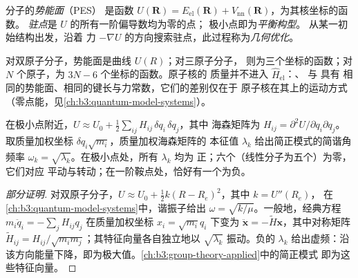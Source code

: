\begin{definition}\label{def:b3:computational-chemistry:pes}
分子的\emph{势能面}（PES）
是函数 $U(\mathbf R) = E_{\mathrm{el}}(\mathbf R) +
V_{\mathrm{nn}}(\mathbf R)$，为其核坐标的函数。
\emph{驻点}是 $U$ 的所有一阶偏导数均为零的点；
极小点即为\emph{平衡构型}。
从某一初始结构出发，沿着
力 $-\nabla U$ 的方向搜索驻点，此过程称为\emph{几何优化}。
\end{definition}

对双原子分子，势能面是曲线 $U(R)$；对三原子分子，
则为三个坐标的函数；对 $N$ 个原子，为 $3N - 6$ 个坐标的函数。原子核的
质量并不进入 $\hat H_{\mathrm{el}}$：、 与  具有
相同的势能面、相同的键长与力常数，它们的差别仅在于
原子核在其上的运动方式（零点能，见\cref{ch:b3:quantum-model-systems}）。

\begin{proposition}[由海森矩阵求频率]\label{prop:b3:computational-chemistry:hessian}
在极小点附近，$U \approx U_0 + \frac12\sum_{ij}H_{ij}\,\delta q_i\,\delta q_j$，其中
海森矩阵为 $H_{ij} = \partial^2U/\partial q_i\partial q_j$。取质量加权坐标
$\delta q_i\sqrt{m_i}$，质量加权海森矩阵的
本征值 $\lambda_k$ 给出简正模式的简谐角频率 $\omega_k =
\sqrt{\lambda_k}$。在极小点处，所有 $\lambda_k$ 均为
正；六个（线性分子为五个）为零，它们对应
平动与转动；在一阶鞍点处，恰好有一个为负。
\end{proposition}

\begin{proof}[部分证明]
对双原子分子，$U \approx U_0 + \frac12k(R - R_e)^2$，其中 $k = U''(R_e)$，
在\cref{ch:b3:quantum-model-systems}中，谐振子给出 $\omega =
\sqrt{k/\mu}$。一般地，经典方程 $m_i\ddot q_i =
-\sum_jH_{ij}q_j$ 在质量加权坐标 $x_i = \sqrt{m_i}q_i$ 下变为
$\ddot{\mathbf x} = -\tilde H\mathbf x$，其中对称矩阵 $\tilde H_{ij} =
H_{ij}/\sqrt{m_im_j}$；其特征向量各自独立地以
$\sqrt{\lambda_k}$ 振动。负的 $\lambda_k$ 给出虚频：沿
该方向能量下降，即为极大值。\cref{ch:b3:group-theory-applied}中的简正模式
即为这些特征向量。
\end{proof}


